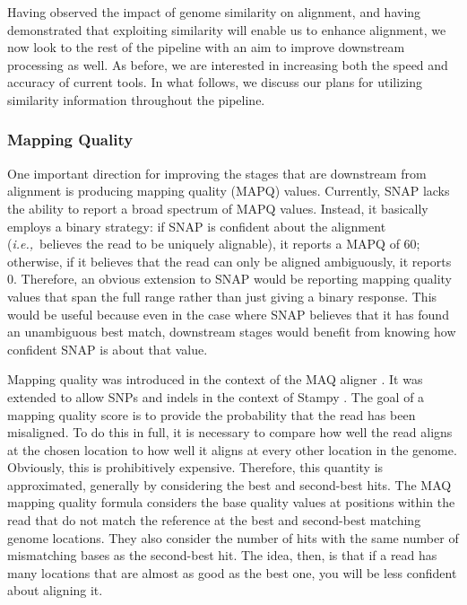 \documentclass[twocolumn,10pt]{article}
\newcommand{\ie}{{\em i.e.,}~}
\begin{document}
Having observed the impact of genome similarity on alignment, and having demonstrated that exploiting similarity will enable us to enhance alignment, we now look to the rest of the pipeline with an aim to improve downstream processing as well.  As before, we are interested in increasing both the speed and accuracy of current tools.  In what follows, we discuss our plans for utilizing similarity information throughout the pipeline.

\subsubsection{Mapping Quality}

One important direction for improving the stages that are downstream from alignment is producing mapping quality (MAPQ) values.  Currently, SNAP lacks the ability to report a broad spectrum of MAPQ values.  Instead, it basically employs a binary strategy:  if SNAP is confident about the alignment (\ie believes the read to be uniquely alignable), it reports a MAPQ of 60; otherwise, if it believes that the read can only be aligned ambiguously, it reports 0.  Therefore, an obvious extension to SNAP would be reporting mapping quality values that span the full range rather than just giving a binary response.  This would be useful because even in the case where SNAP believes that it has found an unambiguous best match, downstream stages would benefit from knowing how confident SNAP is about that value.

Mapping quality was introduced in the context of the MAQ aligner \cite{Li:2008}.  It was extended to allow SNPs and indels in the context of Stampy \cite{Lunter:2010}.  The goal of a mapping quality score is to provide the probability that the read has been misaligned.  To do this in full, it is necessary to compare how well the read aligns at the chosen location to how well it aligns at every other location in the genome.  Obviously, this is prohibitively expensive.  Therefore, this quantity is approximated, generally by considering the best and second-best hits.  The MAQ mapping quality formula considers the base quality values at positions within the read that do not match the reference at the best and second-best matching genome locations.  They also consider the number of hits with the same number of mismatching bases as the second-best hit.  The idea, then, is that if a read has many locations that are almost as good as the best one, you will be less confident about aligning it.
\end{document}

